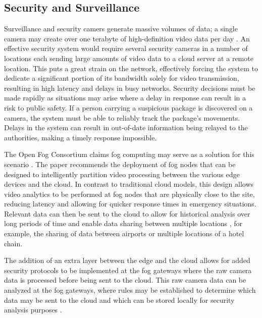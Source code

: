 \documentclass{article}
\begin{document}
\subsection{Security and Surveillance}
Surveillance and security camers generate massive volumes of data; a single camera may create over one terabyte of high-definition video data per day \cite{openfogconsortium2017visualsecurity}. An effective security system would require several security cameras in a number of locations each sending large amounts of video data to a cloud server at a remote location. This puts a great strain on the network, effectively forcing the system to dedicate a significant portion of its bandwidth solely for video transmission, resulting in high latency and delays in busy networks. Security decisions must be made rapidly as situations may arise where a delay in response can result in a risk to public safety. If a person carrying a suspicious package is discovered on a camera, the system must be able to reliably track the package's movements. Delays in the system can result in out-of-date information being relayed to the authorities, making a timely response impossible.

The Open Fog Consortium claims fog computing may serve as a solution for this scenario \cite{openfogconsortium2017visualsecurity}. The paper recommends the deployment of fog nodes that can be designed to intelligently partition video processing between the various edge devices and the cloud. In contrast to traditional cloud models, this design allows video analytics to be performed at fog nodes that are physically close to the site, reducing latency and allowing for quicker response times in emergency situations. Relevant data can then be sent to the cloud to allow for historical analysis over long periods of time and enable data sharing between multiple locations \cite{openfogconsortium2017visualsecurity}, for example, the sharing of data between airports or multiple locations of a hotel chain.

The addition of an extra layer between the edge and the cloud allows for added security protocols to be implemented at the fog gateways where the raw camera data is processed before being sent to the cloud. This raw camera data can be analyzed at the fog gateways, where rules may be established to determine which data may be sent to the cloud and which can be stored locally for security analysis purposes \cite{openfogconsortium2017visualsecurity}.
\end{document}
